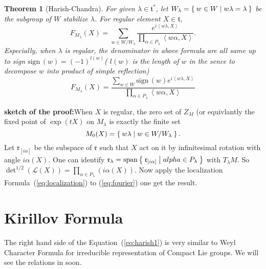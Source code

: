 \documentclass[11pt]{amsart}
\newtheorem{Thm}{Theorem}
\def\cL{{\mathcal{L}}}
\def\ftt{{\mathfrak{t}}}
\def\frr{{\mathfrak{r}}}
\def\sproof{{\bf sketch of the proof:}}
\def\inn#1#2{\left<{#1},{#2}\right>}
\def\sign{\mathrm{sign\,}}
\def\sspan{\mathrm{span}}
\begin{document}
\begin{Thm}[Harish-Chandra]
For given $\lambda\in \ftt^*$, let $W_\lambda = \Set{w\in W|w\lambda = \lambda}$
be the subgroup of $W$ stabilize $\lambda$. For regular element $X\in \ftt$, 
\begin{equation}\label{eq:fourier}
F_{M_\lambda}(X) = \sum_{w\in W/W_\lambda}\frac{e^{i\inn{w\lambda}{X}}}{
\prod_{\alpha\in P_\lambda}\inn{w\alpha}{X}}. 
\end{equation}
Especially, when $\lambda$ is regular, the denominator in above formula are 
all same up to sign $\sign(w) = (-1)^{l(w)}$( $l(w)$ is the length of $w$ in the sence to decompose $w$ into product of simple reflection)
\begin{equation}
\label{eq:harish1}
F_{M_\lambda}(X) = \frac{\sum_{w\in W} \sign(w)e^{i\inn{w\lambda}{X}}}{\prod_{\alpha\in P_\lambda}\inn{w\alpha}{X}}
\end{equation}
\end{Thm}
\sproof When $X$ is regular, the zero set of $Z_M$
(or equivlantly the fixed point of $\exp(tX)$ on $M_\lambda$ is exactly
the finite set 
\[
M_0(X) = \Set{w\lambda|w\in W/W_\lambda}.
\]
Let $\frr_{[i\alpha]}$ be the subspace of $\frr$ 
such that $X$ act on it by infinitesimal rotation with angle $i\alpha(X)$.
One can identify $\frr_\lambda = \sspan\Set{\frr_{[i\alpha]}|alpha \in P_\lambda}$ 
with $T_\lambda M$. So $\det^{1/2}(\cL(X)) = \prod_{\alpha\in P_\lambda}(i\alpha(X))$.
Now apply the localization Formula~(\ref{eq:localization}) 
to (\ref{eq:fourier}) one get the result.

\section{Kirillov Formula}
The right hand side of the Equation~(\ref{eq:harish1}) is very similar to 
Weyl Character Formula for irreducible representation of Compact Lie groups.
We will see the relations in soon.


\end{document}
